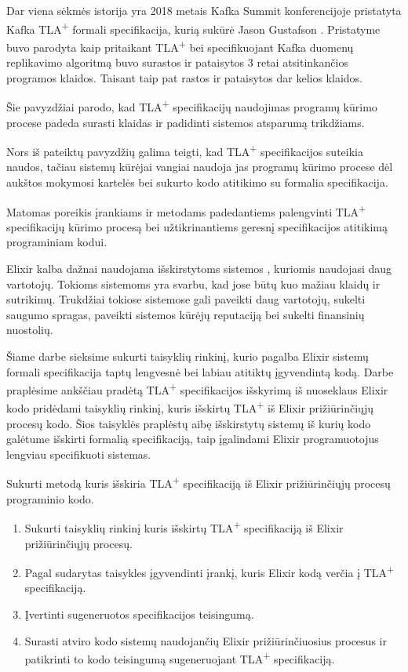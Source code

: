 \documentclass{VUMIFPSmagistrinis}
\begin{document}
		Dar viena sėkmės istorija yra 2018 metais Kafka Summit konferencijoje pristatyta Kafka TLA\textsuperscript{+} formali specifikacija, kurią sukūrė Jason Gustafson \cite{kfkTla}.
		Pristatyme buvo parodyta kaip pritaikant TLA\textsuperscript{+} bei specifikuojant Kafka duomenų replikavimo algoritmą buvo surastos ir pataisytos 3 retai atsitinkančios programos klaidos.
		Taisant taip pat rastos ir pataisytos dar kelios klaidos.

        Šie pavyzdžiai parodo, kad TLA\textsuperscript{+} specifikacijų naudojimas programų kūrimo procese padeda surasti klaidas ir padidinti sistemos atsparumą trikdžiams.

        Nors iš pateiktų pavyzdžių galima teigti, kad TLA\textsuperscript{+} specifikacijos suteikia naudos, tačiau sistemų kūrėjai vangiai naudoja jas programų kūrimo procese dėl aukštos mokymosi
        kartelės bei sukurto kodo atitikimo su formalia specifikacija.

        Matomas poreikis įrankiams ir metodams padedantiems palengvinti TLA\textsuperscript{+} specifikacijų kūrimo procesą bei užtikrinantiems geresnį specifikacijos atitikimą programiniam kodui. 

        Elixir kalba dažnai naudojama išskirstytoms sistemos \cite{expop}, kuriomis naudojasi daug vartotojų. 
        Tokioms sistemoms yra svarbu, kad jose būtų kuo mažiau klaidų ir sutrikimų.
        Trukdžiai tokiose sistemose gali paveikti daug vartotojų, sukelti saugumo spragas, paveikti sistemos kūrėjų reputaciją bei sukelti finansinių nuostolių.

        Šiame darbe sieksime sukurti taisyklių rinkinį, kurio pagalba Elixir sistemų formali specifikacija taptų lengvesnė bei labiau atitiktų įgyvendintą kodą.
        Darbe praplėsime ankščiau pradėtą TLA\textsuperscript{+} specifikacijos išskyrimą iš nuoseklaus Elixir kodo pridėdami taisyklių rinkinį, kuris išskirtų TLA\textsuperscript{+} iš Elixir prižiūrinčiųjų procesų kodo. 
        Šios taisyklės praplėstų aibę išskirstytų sistemų iš kurių kodo galėtume išskirti formalią specifikaciją, taip įgalindami Elixir programuotojus lengviau specifikuoti sistemas.

		Sukurti metodą kuris išskiria TLA\textsuperscript{+} specifikaciją iš Elixir prižiūrinčiųjų procesų programinio kodo.

	
		\begin{enumerate}
			\item{Sukurti taisyklių rinkinį kuris išskirtų TLA\textsuperscript{+} specifikaciją iš Elixir prižiūrinčiųjų procesų.}
			\item{Pagal sudarytas taisykles įgyvendinti įrankį, kuris Elixir kodą verčia į TLA\textsuperscript{+} specifikaciją.}
			\item{Įvertinti sugeneruotos specifikacijos teisingumą.}
			\item{Surasti atviro kodo sistemų naudojančių Elixir prižiūrinčiuosius procesus ir patikrinti to kodo teisingumą sugeneruojant TLA\textsuperscript{+} specifikaciją.}
		\end{enumerate}
	
\end{document}
